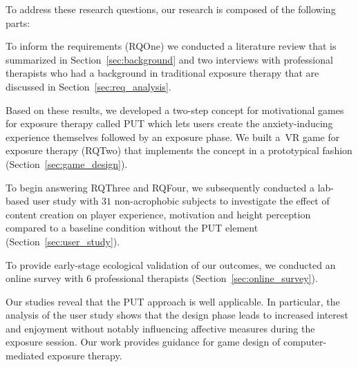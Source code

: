 To address these research questions, our research is composed of the following parts:
\begin{enumerate*}
\item To inform the requirements (\acl{RQOne}) we conducted a literature review that is summarized in Section~\ref{sec:background} and two interviews with professional therapists who had a background in traditional exposure therapy that are discussed in Section~\ref{sec:req_analysis}. 
\item Based on these results, we developed a two-step concept for motivational games for exposure therapy called \ac{PUT} which lets users create the anxiety-inducing experience themselves followed by an exposure phase. %
We built a~\ac{VR} game for exposure therapy (\acl{RQTwo}) that implements the concept in a prototypical fashion (Section~\ref{sec:game_design}). 
\item To begin answering \acl{RQThree} and \acl{RQFour}, we subsequently conducted a lab-based user study with $31$ non-acrophobic subjects to investigate the effect of content creation on player experience, motivation and height perception compared to a baseline condition without the \ac{PUT} element (Section~\ref{sec:user_study}). 
\item %
To provide early-stage ecological validation of our outcomes, we conducted an online survey with $6$ professional therapists (Section~\ref{sec:online_survey}).
\end{enumerate*}


Our studies reveal that the \ac{PUT} approach is well applicable. In particular, the analysis of the user study shows that the design phase leads to increased interest and enjoyment without notably influencing affective measures during the exposure session. Our work provides guidance for game design of computer-mediated exposure therapy.

